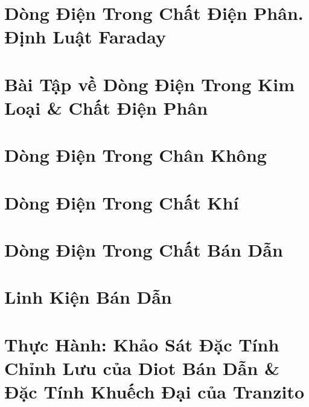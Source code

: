 \documentclass[oneside]{book}
\numberwithin{equation}{section}
\begin{document}

\section{Dòng Điện Trong Chất Điện Phân. Định Luật Faraday}


\section{Bài Tập về Dòng Điện Trong Kim Loại \& Chất Điện Phân}


\section{Dòng Điện Trong Chân Không}


\section{Dòng Điện Trong Chất Khí}


\section{Dòng Điện Trong Chất Bán Dẫn}


\section{Linh Kiện Bán Dẫn}


\section{Thực Hành: Khảo Sát Đặc Tính Chỉnh Lưu của Diot Bán Dẫn \& Đặc Tính Khuếch Đại của Tranzito}
\end{document}
